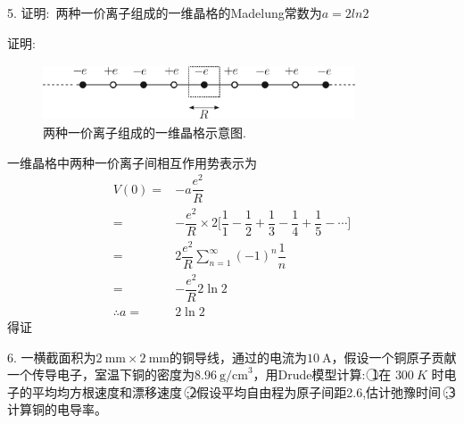 5. 证明:~两种一价离子组成的一维晶格的\textrm{Madelung}常数为$a=2ln2$

证明:~
\begin{figure}[h!]
\centering
\vspace*{-0.05in}
\includegraphics[height=0.65in,width=3.65in,viewport=0 0 963 162,clip]{Figures/Madelung_constant.png}
\caption{\small 两种一价离子组成的一维晶格示意图.}%
\label{Fig:Madelung_constant}
\end{figure}
一维晶格中两种一价离子间相互作用势表示为
\begin{displaymath}
	\begin{aligned}
		V(0)=&-a\dfrac{e^2}{R}\\
		=&-\dfrac{e^2}R\times2\bigg[\dfrac11-\dfrac12+\dfrac13-\dfrac14+\dfrac15-\cdots\bigg]\\
		=&2\dfrac{e^2}R\sum_{n=1}^{\infty}(-1)^n\dfrac1n\\
		=&-\dfrac{e^2}R2\ln2\\
		\therefore a=&2\ln2
	\end{aligned}
\end{displaymath}
得证

6. 一横截面积为$2~\mathrm{mm}\times2~\mathrm{mm}$的铜导线，通过的电流为$10~\mathrm{A}$，假设一个铜原子贡献一个传导电子，室温下铜的密度为$8.96~\mathrm{g/cm}^3$，用Drude模型计算:~\textcircled{1}在 $300~K$ 时电子的平均均方根速度和漂移速度 ;\textcircled{2}假设平均自由程为原子间距2.6,估计弛豫时间 ;\textcircled{3}计算铜的电导率。

